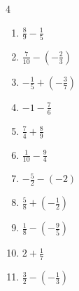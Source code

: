 \begin{multicols}{4}
\begin{enumerate}

  \item $\displaystyle \frac{8}{9} - \frac{1}{5}$


  \item $\displaystyle \frac{7}{10} - \left(-\frac{2}{3}\right)$


  \item $\displaystyle -\frac{1}{5} + \left(-\frac{3}{7}\right)$


  \item $\displaystyle -1 - \frac{7}{6}$


\columnbreak %

  \item $\displaystyle \frac{7}{4} + \frac{8}{9}$


  \item $\displaystyle \frac{1}{10} - \frac{9}{4}$


  \item $\displaystyle -\frac{5}{2} - \left(-2\right)$


  \item $\displaystyle \frac{5}{8} + \left(-\frac{1}{2}\right)$


  \item $\displaystyle \frac{1}{8} - \left(-\frac{9}{5}\right)$


  \item $\displaystyle 2 + \frac{1}{7}$


  \item $\displaystyle \frac{3}{2} - \left(-\frac{1}{3}\right)$



\end{enumerate}
\end{multicols}
